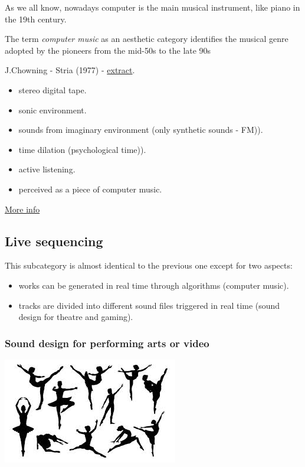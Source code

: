 As we all know, nowadays computer is the main musical instrument, like piano in the 19th century.

The term \textit{computer music} as an aesthetic category identifies the musical genre adopted by the pioneers from the mid-50s to the late 90s

J.Chowning - Stria (1977) - \href{https://github.com/musicaecodice/EMC/blob/main/2_instruments/suoni/chowning%20.mp3}{extract}.

\begin{itemize}
\tightlist
\item stereo digital tape.
\item sonic environment.
\item sounds from imaginary environment (only synthetic sounds - FM)).
\item time dilation (psychological time)).
\item active listening.
\item perceived as a piece of computer music.
\end{itemize}

\href{img/max.pdf}{More info}

\subsection{Live sequencing}\label{live-sequencing}

This subcategory is almost identical to the previous one except for two aspects: 

\begin{itemize}
\tightlist
\item works can be generated in real time through algorithms (computer music). 
\item tracks are divided into different sound files triggered in real time (sound design for theatre and gaming).
\end{itemize}

\subsubsection{Sound design for performing arts or video }\label{sound-design-for-performing-arts-or-video}

\begin{center}
\includegraphics[scale=0.4]{../img/danza.png}
\end{center}

